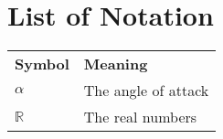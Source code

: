 \documentclass{ctuthesis}
\begin{document}
\appendix

\chapter*{List of Notation}

\noindent
\begin{tabularx}{\linewidth}
  { l >{\raggedright\arraybackslash}X }
\bfseries Symbol & \bfseries Meaning \\\Midrule
$\alpha$ & The angle of attack \\
$\mathbb{R}$ & The real numbers \\
\end{tabularx}
\end{document}
